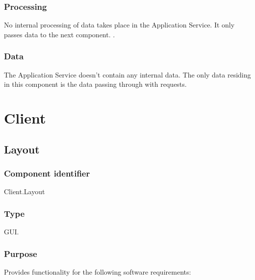\subsubsection*{Processing}
No internal processing of data takes place in the Application Service. It only passes data to the next component. .

\subsubsection*{Data}
The Application Service doesn't contain any internal data. The only data residing in this component is the data passing through with requests. 

\section{Client}
\subsection{Layout}

\subsubsection*{Component identifier}
Client.Layout

\subsubsection*{Type}
GUI.

\subsubsection*{Purpose}
Provides functionality for the following software requirements:

